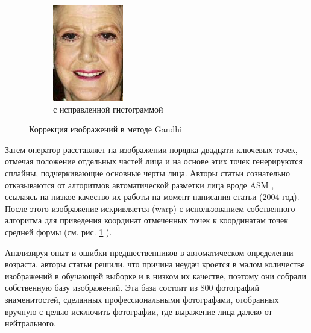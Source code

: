 \begin{figure}[t]
\begin{subfigure}[t]{0.25\textwidth}
		\includegraphics[width=\textwidth]{gandhi/from_57_3.png}
		\caption{с исправленной гистограммой}
	\end{subfigure}
	\caption{Коррекция изображений в методе Gandhi}
	\label{fig:gandhi}
\end{figure}

Затем оператор расставляет на изображении порядка двадцати ключевых точек, отмечая положение отдельных частей лица и на основе этих точек генерируются сплайны, подчеркивающие основные черты лица. Авторы статьи сознательно отказываются от алгоритмов автоматической разметки лица вроде ASM \cite{asm}, ссылаясь на низкое качество их работы на момент написания статьи (2004 год). После этого изображение искривляется (warp) с использованием собственного алгоритма для приведения координат отмеченных точек к координатам точек средней формы (см. рис. \ref{fig:gandhi} ).

Анализируя опыт и ошибки предшественников в автоматическом определении возраста, авторы статьи решили, что причина неудач кроется в малом количестве изображений в обучающей выборке и в низком их качестве, поэтому они собрали собственную базу изображений. Эта база состоит из 800 фотографий знаменитостей, сделанных профессиональными фотографами, отобранных вручную с целью исключить фотографии, где выражение лица далеко от нейтрального.

